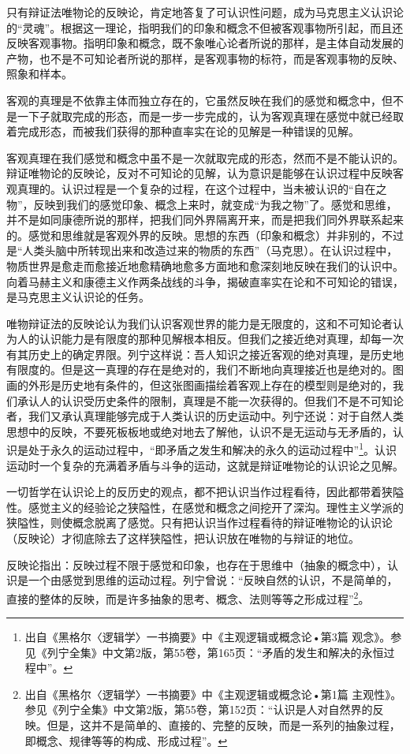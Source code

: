 \documentclass[UTF8, 12pt, a4paper]{ctexrep}
\begin{document}
只有辩证法唯物论的反映论，肯定地答复了可认识性问题，成为马克思主义认识论的“灵魂”。根据这一理论，指明我们的印象和概念不但被客观事物所引起，而且还反映客观事物。指明印象和概念，既不象唯心论者所说的那样，是主体自动发展的产物，也不是不可知论者所说的那样，是客观事物的标符，而是客观事物的反映、照象和样本。

客观的真理是不依靠主体而独立存在的，它虽然反映在我们的感觉和概念中，但不是一下子就取完成的形态，而是一步一步完成的，认为客观真理在感觉中就已经取着完成形态，而被我们获得的那种直率实在论的见解是一种错误的见解。

客观真理在我们感觉和概念中虽不是一次就取完成的形态，然而不是不能认识的。辩证唯物论的反映论，反对不可知论的见解，认为意识是能够在认识过程中反映客观真理的。认识过程是一个复杂的过程，在这个过程中，当未被认识的“自在之物”，反映到我们的感觉印象、概念上来时，就变成“为我之物”了。感觉和思维，并不是如同康德所说的那样，把我们同外界隔离开来，而是把我们同外界联系起来的。感觉和思维就是客观外界的反映。思想的东西（印象和概念）并非别的，不过是“人类头脑中所转现出来和改造过来的物质的东西”（马克思）。在认识过程中，物质世界是愈走而愈接近地愈精确地愈多方面地和愈深刻地反映在我们的认识中。向着马赫主义和康德主义作两条战线的斗争，揭破直率实在论和不可知论的错误，是马克思主义认识论的任务。

唯物辩证法的反映论认为我们认识客观世界的能力是无限度的，这和不可知论者认为人的认识能力是有限度的那种见解根本相反。但我们之接近绝对真理，却每一次有其历史上的确定界限。列宁这样说：吾人知识之接近客观的绝对真理，是历史地有限度的。但是这一真理的存在是绝对的，我们不断地向真理接近也是绝对的。图画的外形是历史地有条件的，但这张图画描绘着客观上存在的模型则是绝对的，我们承认人的认识受历史条件的限制，真理是不能一次获得的。但我们不是不可知论者，我们又承认真理能够完成于人类认识的历史运动中。列宁还说：对于自然人类思想中的反映，不要死板板地或绝对地去了解他，认识不是无运动与无矛盾的，认识是处于永久的运动过程中，“即矛盾之发生和解决的永久的运动过程中”\footnote{出自《黑格尔〈逻辑学〉一书摘要》中《主观逻辑或概念论•第3篇 观念》。参见《列宁全集》中文第2版，第55卷，第165页：“矛盾的发生和解决的永恒过程中”。}。认识运动时一个复杂的充满着矛盾与斗争的运动，这就是辩证唯物论的认识论之见解。

一切哲学在认识论上的反历史的观点，都不把认识当作过程看待，因此都带着狭隘性。感觉主义的经验论之狭隘性，在感觉和概念之间挖开了深沟。理性主义学派的狭隘性，则使概念脱离了感觉。只有把认识当作过程看待的辩证唯物论的认识论（反映论）才彻底除去了这样狭隘性，把认识放在唯物的与辩证的地位。

反映论指出：反映过程不限于感觉和印象，也存在于思维中（抽象的概念中），认识是一个由感觉到思维的运动过程。列宁曾说：“反映自然的认识，不是简单的，直接的整体的反映，而是许多抽象的思考、概念、法则等等之形成过程”\footnote{出自《黑格尔〈逻辑学〉一书摘要》中《主观逻辑或概念论•第1篇 主观性》。参见《列宁全集》中文第2版，第55卷，第152页：“认识是人对自然界的反映。但是，这并不是简单的、直接的、完整的反映，而是一系列的抽象过程，即概念、规律等等的构成、形成过程”。}。
\end{document}
